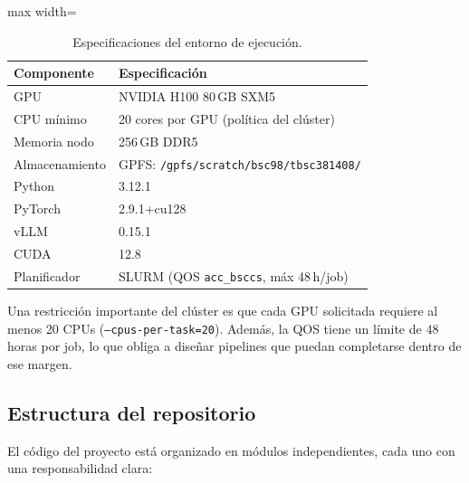 \documentclass[11pt,a4paper]{article}
\begin{document}
\begin{table}[H]
\centering
\caption{Especificaciones del entorno de ejecuci\'on.}
\label{tab:infra}
\begin{adjustbox}{max width=\textwidth}
\begin{tabular}{@{}ll@{}}
\toprule
\textbf{Componente} & \textbf{Especificaci\'on} \\
\midrule
GPU             & NVIDIA H100 80\,GB SXM5 \\
CPU m\'inimo    & 20 cores por GPU (pol\'itica del cl\'uster) \\
Memoria nodo    & 256\,GB DDR5 \\
Almacenamiento  & GPFS: \texttt{/gpfs/scratch/bsc98/tbsc381408/} \\
\midrule
Python          & 3.12.1 \\
PyTorch         & 2.9.1+cu128 \\
vLLM            & 0.15.1 \\
CUDA            & 12.8 \\
Planificador    & SLURM (QOS \texttt{acc\_bsccs}, m\'ax 48\,h/job) \\
\bottomrule
\end{tabular}
\end{adjustbox}
\end{table}

Una restricci\'on importante del cl\'uster es que cada GPU solicitada
requiere al menos 20 CPUs (\texttt{--cpus-per-task=20}). Adem\'as, la
QOS tiene un l\'imite de 48 horas por job, lo que obliga a dise\~nar
pipelines que puedan completarse dentro de ese margen.

\subsection{Estructura del repositorio}

El c\'odigo del proyecto est\'a organizado en m\'odulos independientes,
cada uno con una responsabilidad clara:
\end{document}
